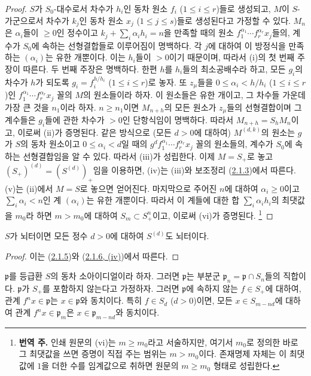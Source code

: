 \begin{proof}
$S$가 $S_0$-대수로서 차수가 $h_i$인 동차 원소 $f_i$
($1\leq i\leq r$)들로 생성되고, $M$이 $S$-가군으로서 차수가 $k_j$인
동차 원소 $x_j$ ($1\leq j\leq s$)들로 생성된다고 가정할 수 있다.
$M_n$은 $\alpha_i$들이 $\geq0$인 정수이고
$k_j+\sum_i\alpha_i h_i=n$을 만족할 때의 원소
$f_1^{\alpha_1}\cdots f_r^{\alpha_r}x_j$들의, 계수가 $S_0$에 속하는
선형결합들로
이루어짐이 명백하다. 각 $j$에 대하여 이 방정식을 만족하는
$(\alpha_i)$는 유한 개뿐이다. 이는 $h_i$들이 $>0$이기 때문이며, 따라서
(i)의 첫 번째 주장이 따른다. 두 번째 주장은 명백하다. 한편 $h$를
$h_i$들의 최소공배수라 하고, 모든 $g_i$의 차수가 $h$가 되도록
$g_i=f_i^{h/h_i}$ ($1\leq i\leq r$)로 놓자. 또 $z_\mu$들을
$0\leq\alpha_i<h/h_i$ ($1\leq i\leq r$)인
$f_1^{\alpha_1}\cdots f_r^{\alpha_r}x_j$ 꼴의 $M$의 원소들이라 하자.
이 원소들은 유한 개이고, 그 차수들 가운데 가장 큰 것을 $n_1$이라 하자.
$n\geq n_1$이면 $M_{n+h}$의 모든 원소가 $z_\mu$들의 선형결합이며 그
계수들은 $g_i$들에 관한 차수가 $>0$인 단항식임이 명백하다. 따라서
$M_{n+h}=S_hM_n$이고, 이로써 (ii)가 증명된다. 같은 방식으로 (모든
$d>0$에 대하여) $M^{(d,k)}$의 원소는 $g$가 $S$의 동차 원소이고
$0\leq\alpha_i<d$일 때의
$g^df_1^{\alpha_1}\cdots f_r^{\alpha_r}x_j$ 꼴의 원소들의, 계수가
$S_0$에 속하는 선형결합임을 알 수 있다. 따라서 (iii)가 성립한다. 이제
$M=S_+$로 놓고 $(S_+)^{(d)}=(S^{(d)})_+$임을 이용하면, (iv)는
(iii)와 보조정리 (\hyperref[II.2.1.3-ko]{2.1.3})에서 따른다. (v)는
(ii)에서 $M=S$로 놓으면 얻어진다. 마지막으로 주어진 $n$에 대하여
$\alpha_i\geq0$이고 $\sum_i\alpha_i<n$인 계 $(\alpha_i)$는 유한 개뿐이다.
따라서 이 계들에 대한 합 $\sum_i\alpha_i h_i$의 최댓값을 $m_0$라 하면
$m>m_0$에 대하여 $S_m\subset S_+^n$이고, 이로써 (vi)가 증명된다.
\footnote{\textbf{번역 주.} 인쇄 원문의 (vi)는 $m\geq m_0$라고 서술하지만,
여기서 $m_0$로 정의한 바로 그 최댓값을 쓰면 증명이 직접 주는 범위는
$m>m_0$이다. 존재명제 자체는 이 최댓값에 $1$을 더한 수를 임계값으로
취하면 원문의 $m\geq m_0$ 형태로 성립한다.}
\end{proof}

\begin{corollary}[2.1.7]
\label{II.2.1.7-ko}
$S$가 뇌터이면 모든 정수 $d>0$에 대하여 $S^{(d)}$도 뇌터이다.
\end{corollary}

\begin{proof}
이는 (\hyperref[II.2.1.5-ko]{2.1.5})와
(\hyperref[II.2.1.6-ko]{2.1.6, (iv)})에서 따른다.
\end{proof}

\begin{env}[2.1.8]
\label{II.2.1.8-ko}
$\mathfrak{p}$를 등급환 $S$의 동차 소아이디얼이라 하자. 그러면
$\mathfrak{p}$는 부분군 $\mathfrak{p}_n=\mathfrak{p}\cap S_n$들의
직합이다. $\mathfrak{p}$가 $S_+$를 포함하지 않는다고 가정하자. 그러면
$\mathfrak{p}$에 속하지 않는 $f\in S_+$에 대하여, 관계
$f^nx\in\mathfrak{p}$는 $x\in\mathfrak{p}$와 동치이다. 특히
$f\in S_d$ ($d>0$)이면, 모든 $x\in S_{m-nd}$에 대하여 관계
$f^nx\in\mathfrak{p}_m$은 $x\in\mathfrak{p}_{m-nd}$와 동치이다.
\end{env}

